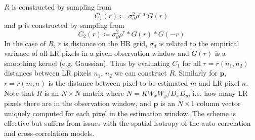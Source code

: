 %
$R$ is constructed by sampling from
\begin{equation}
	C_1(r) \coloneqq \sigma_{d}^2 \rho^{r} \ast G(r)
\end{equation}
and $\bm{p}$ is constructed by sampling from
\begin{equation}
	C_2(r) \coloneqq \sigma_d^2 \rho^{r} \ast G(r) \ast G(-r)
\end{equation}
In the case of $R$, $r$ is distance on the HR grid, $\sigma_d$ is related to the empirical variance of all LR pixels in a given observation window and $G(r)$ is a smoothing kernel (e.g. Gaussian).
%
Thus by evaluating $C_1$ for all $r = r(n_1, n_2)$ distances between LR pixels $n_1$, $n_2$ we can construct $R$.
%
Similarly for $\bm{p}$, $r = r(m, n)$ is the distance between pixel-to-be-estimated $m$ and LR pixel $n$.
%
Note that $R$ is an $N \times N$ matrix where $N = K W_x W_y/D_x D_y$, i.e. how many LR pixels there are in the observation window, and $\bm{p}$ is an $N \times 1$ column vector uniquely computed for each pixel in the estimation window.
%
The scheme is effective but suffers from issues with the spatial isotropy of the auto-correlation and cross-correlation models.
